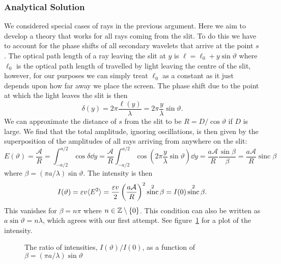 \documentclass[a4paper]{article}
\DeclareMathOperator{\sinc}{sinc}
\begin{document}
    \subsubsection{Analytical Solution}
    We considered special cases of rays in the previous argument.
    Here we aim to develop a theory that works for all rays coming from the slit.
    To do this we have to account for the phase shifts of all secondary wavelets that arrive at the point \(s\).
    The optical path length of a ray leaving the slit at \(y\) is \(\ell = \ell_0 + y\sin\vartheta\) where \(\ell_0\) is the optical path length of travelled by light leaving the centre of the slit, however, for our purposes we can simply treat \(\ell_0\) as a constant as it just depends upon how far away we place the screen.
    The phase shift due to the point at which the light leaves the slit is then
    \[\delta(y) = 2\pi\frac{\ell(y)}{\lambda} = 2\pi\frac{y}{\lambda}\sin\vartheta.\]
    We can approximate the distance of \(s\) from the slit to be \(R = D/\cos\vartheta\) if \(D\) is large.
    We find that the total amplitude, ignoring oscillations, is then given by the superposition of the amplitudes of all rays arriving from anywhere on the slit:
    \begin{equation}\label{eqn:single slit amplitude}
        E(\vartheta) = \frac{\mathcal{A}}{R} = \int_{-a/2}^{a/2}\cos\delta \dd{y} = \frac{\mathcal{A}}{R}\int_{-a/2}^{a/2} \cos\left( 2\pi\frac{y}{\lambda}\sin\vartheta \right)\dd{y} = \frac{a\mathcal{A}}{R}\frac{\sin\beta}{\beta} = \frac{a\mathcal{A}}{R}\sinc\beta
    \end{equation}
    where \(\beta = (\pi a/\lambda)\sin\vartheta\).
    The intensity is then
    \[I(\vartheta) = \varepsilon v\expected{E^2} = \frac{\varepsilon v}{2}\left( \frac{a\mathcal{A}}{R} \right)^2\sinc^2\beta = I(0)\sinc^2\beta.\]
    This vanishes for \(\beta = n\pi\) where \(n\in\mathbb{Z}\setminus\{0\}\).
    This condition can also be written as \(a\sin\vartheta = n\lambda\), which agrees with our first attempt.
    See figure~\ref{fig:sinc squared} for a plot of the intensity.
    
    \begin{figure}[htb]
        \centering
        \caption{The ratio of intensities, \(I(\vartheta)/I(0)\), as a function of \(\beta = (\pi a/\lambda)\sin\vartheta\)}
        \label{fig:sinc squared}
    \end{figure}
\end{document}
